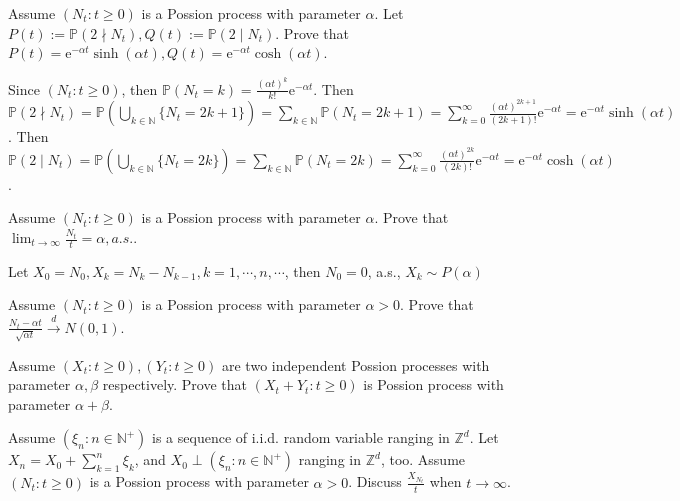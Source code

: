 \documentclass{ctexart}
\newif\ifpreface
\begin{document}
\large
\setlength{\baselineskip}{1.2em}
\ifpreface
  
\else
\fi
{}
\begin{problem}\label{pro:1}
  Assume \((N_t:t \geq 0)\) is a Possion process with parameter \(\alpha\).
  Let \(P(t):=\mathbb{P}(2 \nmid N_t),Q(t):=\mathbb{P}(2 \mid N_t)\).
  Prove that \(P(t)=\mathrm{e}^{-\alpha t}\sinh(\alpha t),Q(t)=\mathrm{e}^{-\alpha t}\cosh(\alpha t)\).
\end{problem}
\begin{solution}
  Since \((N_t: t \geq 0)\), then \(\mathbb{P}(N_t=k)=\frac{(\alpha t)^k}{k!}\mathrm{e}^{-\alpha t}\).
  Then \(\mathbb{P}(2 \nmid N_t)=\mathbb{P}(\bigcup_{k \in \mathbb{N}}\{N_t=2k + 1\})=\sum_{k \in \mathbb{N}}\mathbb{P}(N_t=2k + 1)=\sum_{k=0}^{\infty}\frac{(\alpha t)^{2k + 1}}{(2k + 1)!}\mathrm{e}^{-\alpha t}=\mathrm{e}^{-\alpha t}\sinh(\alpha t)\).
  Then \(\mathbb{P}(2 \mid N_t)=\mathbb{P}(\bigcup_{k \in \mathbb{N}}\{N_t=2k\})=\sum_{k \in \mathbb{N}}\mathbb{P}(N_t=2k)=\sum_{k=0}^{\infty}\frac{(\alpha t)^{2k}}{(2k)!}\mathrm{e}^{-\alpha t}=\mathrm{e}^{-\alpha t}\cosh(\alpha t)\).
\end{solution}

\begin{problem}\label{pro:2}
  Assume \((N_t:t \geq 0)\) is a Possion process with parameter \(\alpha\).
  Prove that \(\lim_{t \to \infty}\frac{N_t}{t}=\alpha,a.s.\).

\end{problem}
\begin{solution}
  Let \(X_0=N_0,X_k=N_k-N_{k-1}, k= 1,\cdots,n,\cdots\), then \(N_0=0\), a.s., \(X_k \sim P(\alpha)\)
\end{solution}

\begin{problem}\label{pro:3}
  Assume \((N_t:t \geq 0)\) is a Possion process with parameter \(\alpha>0\).
  Prove that \(\frac{N_t-\alpha t}{\sqrt{ \alpha t}} \overset{d}{\to} N(0,1)\).
\end{problem}

\begin{problem}\label{pro:4}
  Assume \((X_t:t \geq 0),(Y_t:t \geq 0)\) are two independent Possion processes with parameter \(\alpha,\beta\) respectively.
  Prove that \((X_t + Y_t:t \geq 0)\) is Possion process with parameter \(\alpha + \beta\).
\end{problem}
\begin{problem}\label{pro:5}
  Assume \((\xi_n:n \in \mathbb{N}^+)\) is a sequence of i.i.d. random variable ranging in \(\mathbb{Z}^d\).
  Let \(X_n=X_0 + \sum_{k=1}^{n}\xi_k\), and \(X_0 \perp (\xi_n:n \in \mathbb{N}^+)\) ranging in \(\mathbb{Z}^d\), too.
  Assume \((N_t:t \geq 0)\) is a Possion process with parameter \(\alpha>0\).
  Discuss \(\frac{X_{N_t}}{t}\) when \(t \to \infty\).
\end{problem}
\end{document}
